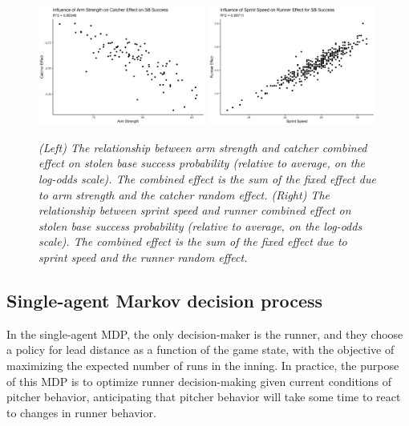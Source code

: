 \documentclass{article}
\begin{document}
      \begin{figure}
        \centering
        \includegraphics[width = 0.49\textwidth]{../../output/figures/catcher_effect.png}
        \includegraphics[width = 0.49\textwidth]{../../output/figures/runner_effect.png}
        \caption{
          \it
          (Left) The relationship between arm strength and catcher combined effect on stolen base success probability (relative to average, on the log-odds scale). The combined effect is the sum of the fixed effect due to arm strength and the catcher random effect.
          (Right) The relationship between sprint speed and runner combined effect on stolen base success probability (relative to average, on the log-odds scale). The combined effect is the sum of the fixed effect due to sprint speed and the runner random effect.
        }
        \label{fig:random-effect}
      \end{figure}

    \subsection{Single-agent Markov decision process}

      In the single-agent MDP, the only decision-maker is the runner, and they choose a policy for lead distance as a function of the game state, with the objective of maximizing the expected number of runs in the inning. In practice, the purpose of this MDP is to optimize runner decision-making given current conditions of pitcher behavior, anticipating that pitcher behavior will take some time to react to changes in runner behavior.
\end{document}
